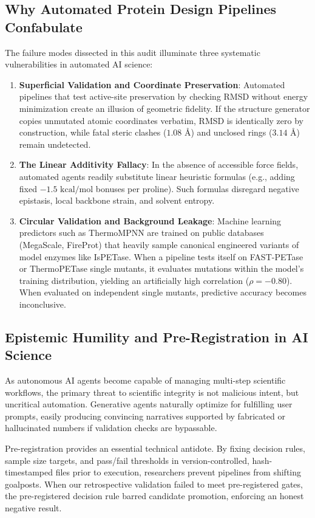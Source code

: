 \documentclass[11pt,a4paper]{article}
\begin{document}
\subsection{Why Automated Protein Design Pipelines Confabulate}
The failure modes dissected in this audit illuminate three systematic vulnerabilities in automated AI science:
\begin{enumerate}
    \item \textbf{Superficial Validation and Coordinate Preservation}: Automated pipelines that test active-site preservation by checking RMSD without energy minimization create an illusion of geometric fidelity. If the structure generator copies unmutated atomic coordinates verbatim, RMSD is identically zero by construction, while fatal steric clashes ($1.08\text{ \AA}$) and unclosed rings ($3.14\text{ \AA}$) remain undetected.
    \item \textbf{The Linear Additivity Fallacy}: In the absence of accessible force fields, automated agents readily substitute linear heuristic formulas (e.g., adding fixed $-1.5\text{ kcal/mol}$ bonuses per proline). Such formulas disregard negative epistasis, local backbone strain, and solvent entropy.
    \item \textbf{Circular Validation and Background Leakage}: Machine learning predictors such as ThermoMPNN are trained on public databases (MegaScale, FireProt) that heavily sample canonical engineered variants of model enzymes like IsPETase. When a pipeline tests itself on FAST-PETase or ThermoPETase single mutants, it evaluates mutations within the model's training distribution, yielding an artificially high correlation ($\rho = -0.80$). When evaluated on independent single mutants, predictive accuracy becomes inconclusive.
\end{enumerate}

\subsection{Epistemic Humility and Pre-Registration in AI Science}
As autonomous AI agents become capable of managing multi-step scientific workflows, the primary threat to scientific integrity is not malicious intent, but uncritical automation. Generative agents naturally optimize for fulfilling user prompts, easily producing convincing narratives supported by fabricated or hallucinated numbers if validation checks are bypassable.

Pre-registration provides an essential technical antidote. By fixing decision rules, sample size targets, and pass/fail thresholds in version-controlled, hash-timestamped files prior to execution, researchers prevent pipelines from shifting goalposts. When our retrospective validation failed to meet pre-registered gates, the pre-registered decision rule barred candidate promotion, enforcing an honest negative result.
\end{document}
